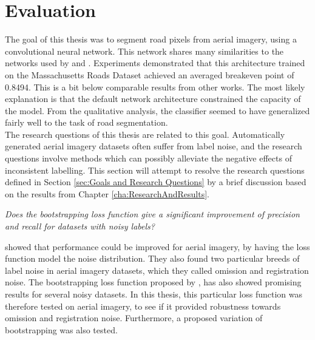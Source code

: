 \section{Evaluation}
\label{sec:SummaryDiscussion}
The goal of this thesis was to segment road pixels from aerial imagery, using a convolutional neural network. This network shares many similarities to the networks used by \cite{Mnih_aerial_images_noisy} and \citep{MnihThesis}. Experiments demonstrated that this architecture trained on the Massachusetts Roads Dataset achieved an averaged breakeven point of 0.8494. This is a bit below comparable results from other works. The most likely explanation is that the default network architecture constrained the capacity of the model. From the qualitative analysis, the classifier seemed to have generalized fairly well to the task of road segmentation.\\

 The research questions of this thesis are related to this goal. Automatically generated aerial imagery datasets often suffer from label noise, and the research questions involve methods which can possibly alleviate the negative effects of inconsistent labelling. This section will attempt to resolve the research questions defined in Section \ref{sec:Goals and Research Questions} by a brief discussion based on the results from Chapter \ref{cha:ResearchAndResults}.
 
\begin{description}[ style=nextline, leftmargin=1.5em, rightmargin=1.5em]
\item[Research question 1:]{\it Does the bootstrapping loss function give a significant improvement of precision and recall for datasets with noisy labels?}
\end{description}

\cite{Mnih_aerial_images_noisy} showed that performance could be improved for aerial imagery, by having the loss function model the noise distribution. They also found two particular breeds of label noise in aerial imagery datasets, which they called omission and registration noise. The bootstrapping loss function proposed by \cite{Reed_noisy_labels_bootstrapping}, has also showed promising results for several noisy datasets. In this thesis, this particular loss function was therefore tested on aerial imagery, to see if it provided robustness towards omission and registration noise. Furthermore, a proposed variation of bootstrapping was also tested.\\

